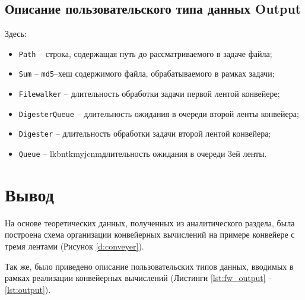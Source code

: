 \subsection{Описание пользовательского типа данных Output}


Здесь:
\begin{itemize}
    \item \texttt{Path} -- строка, содержащая путь до рассматриваемого в задаче файла;
    \item \texttt{Sum} -- \texttt{md5}--хеш содержимого файла, обрабатываемого в рамках задачи;
    \item \texttt{Filewalker} --  длительность обработки задачи первой лентой конвейере;
    \item \texttt{DigesterQueue} -- длительность ожидания в очереди второй ленты конвейера;
    \item \texttt{Digester} -- длительность обработки задачи второй лентой конвейера;
    \item \texttt{Queue} -- lkbntkmyjcnmдлительность ожидания в очереди 3ей ленты.
\end{itemize}

\section{Вывод}

На основе теоретических данных, полученных из аналитического раздела, была построена схема организации конвейерных вычислений на примере конвейере с тремя лентами (Рисунок \ref{d:conveyer}).

Так же, было приведено описание пользовательских типов данных, вводимых в рамках реализации конвейерных вычислений (Листинги \ref{lst:fw_output} -- \ref{lst:output}).